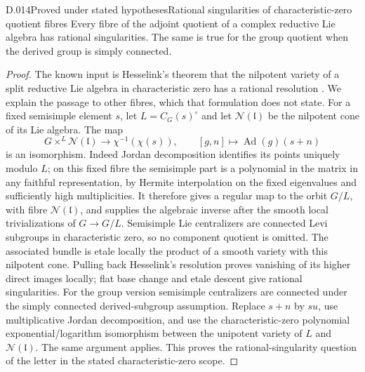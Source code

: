 \begin{saresult}{D.014}{Proved under stated hypotheses}{Rational singularities of characteristic-zero quotient fibres}
Every fibre of the adjoint quotient of a complex reductive Lie
algebra has rational singularities.  The same is true for the group
quotient when the derived group is simply connected.
\end{saresult}
\begin{proof}
The known input is Hesselink's theorem that the nilpotent variety of
a split reductive Lie algebra in characteristic zero has a rational
resolution \cite[Theorem A, p.249]{D-Hesselink}.  We explain the
passage to other fibres, which that formulation does not state.
For a fixed semisimple element $s$, let $L=C_G(s)^\circ$ and let
$\mathcal N(\mathfrak l)$ be the nilpotent cone of its Lie algebra.
The map
\[
 G\times^L\mathcal N(\mathfrak l)\longrightarrow\chi^{-1}(\chi(s)),
 \qquad[g,n]\longmapsto\operatorname{Ad}(g)(s+n)
\]
is an isomorphism.  Indeed Jordan decomposition identifies its
points uniquely modulo $L$; on this fixed fibre the semisimple part
is a polynomial in the matrix in any faithful representation, by
Hermite interpolation on the fixed eigenvalues and sufficiently
high multiplicities.  It therefore gives a regular map to the
orbit $G/L$, with fibre $\mathcal N(\mathfrak l)$, and supplies
the algebraic inverse after the smooth local trivializations of
$G\to G/L$.  Semisimple Lie centralizers are connected Levi
subgroups in characteristic zero, so no component quotient is
omitted.
The associated bundle is etale locally the product of a smooth
variety with this nilpotent cone.  Pulling back Hesselink's
resolution proves vanishing of its higher direct images locally;
flat base change and etale descent give rational singularities.
For the group version semisimple centralizers are connected under
the simply connected derived-subgroup assumption.  Replace
$s+n$ by $su$, use multiplicative Jordan decomposition, and use
the characteristic-zero polynomial exponential/logarithm
isomorphism between the unipotent variety of $L$ and
$\mathcal N(\mathfrak l)$.  The same argument applies.
This proves the rational-singularity question of the letter in
the stated characteristic-zero scope.
\end{proof}

